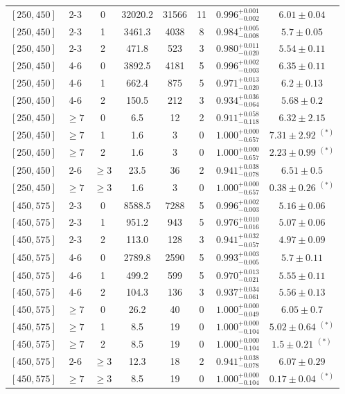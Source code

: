 \begin{table}[!ht]
{\begin{tabular}{ccc|ccccc}
\hline 
$[250,450]$ & 2-3 & 0 & 32020.2 & 31566 & 11 & $0.996^{+0.001}_{-0.002}$ & $6.01 \pm 0.04$ \\ 
$[250,450]$ & 2-3 & 1 & 3461.3 & 4038 & 8 & $0.984^{+0.005}_{-0.008}$ & $5.7 \pm 0.05$ \\ 
$[250,450]$ & 2-3 & 2 & 471.8 & 523 & 3 & $0.980^{+0.011}_{-0.020}$ & $5.54 \pm 0.11$ \\ 
$[250,450]$ & 4-6 & 0 & 3892.5 & 4181 & 5 & $0.996^{+0.002}_{-0.003}$ & $6.35 \pm 0.11$ \\ 
$[250,450]$ & 4-6 & 1 & 662.4 & 875 & 5 & $0.971^{+0.013}_{-0.020}$ & $6.2 \pm 0.13$ \\ 
$[250,450]$ & 4-6 & 2 & 150.5 & 212 & 3 & $0.934^{+0.036}_{-0.064}$ & $5.68 \pm 0.2$ \\ 
$[250,450]$ & $\geq7$ & 0 & 6.5 & 12 & 2 & $0.911^{+0.058}_{-0.118}$ & $6.32 \pm 2.15$ \\ 
$[250,450]$ & $\geq7$ & 1 & 1.6 & 3 & 0 & $1.000^{+0.000}_{-0.657}$ & $7.31 \pm 2.92$ $^{(*)}$ \\ 
$[250,450]$ & $\geq7$ & 2 & 1.6 & 3 & 0 & $1.000^{+0.000}_{-0.657}$ & $2.23 \pm 0.99$ $^{(*)}$ \\ 
$[250,450]$ & 2-6 & $\geq3$ & 23.5 & 36 & 2 & $0.941^{+0.038}_{-0.078}$ & $6.51 \pm 0.5$ \\ 
$[250,450]$ & $\geq7$ & $\geq3$ & 1.6 & 3 & 0 & $1.000^{+0.000}_{-0.657}$ & $0.38 \pm 0.26$ $^{(*)}$ \\ 
\hline 
$[450,575]$ & 2-3 & 0 & 8588.5 & 7288 & 5 & $0.996^{+0.002}_{-0.003}$ & $5.16 \pm 0.06$ \\ 
$[450,575]$ & 2-3 & 1 & 951.2 & 943 & 5 & $0.976^{+0.010}_{-0.016}$ & $5.07 \pm 0.06$ \\ 
$[450,575]$ & 2-3 & 2 & 113.0 & 128 & 3 & $0.941^{+0.032}_{-0.057}$ & $4.97 \pm 0.09$ \\ 
$[450,575]$ & 4-6 & 0 & 2789.8 & 2590 & 5 & $0.993^{+0.003}_{-0.005}$ & $5.7 \pm 0.11$ \\ 
$[450,575]$ & 4-6 & 1 & 499.2 & 599 & 5 & $0.970^{+0.013}_{-0.021}$ & $5.55 \pm 0.11$ \\ 
$[450,575]$ & 4-6 & 2 & 104.3 & 136 & 3 & $0.937^{+0.034}_{-0.061}$ & $5.56 \pm 0.13$ \\ 
$[450,575]$ & $\geq7$ & 0 & 26.2 & 40 & 0 & $1.000^{+0.000}_{-0.049}$ & $6.05 \pm 0.7$ \\ 
$[450,575]$ & $\geq7$ & 1 & 8.5 & 19 & 0 & $1.000^{+0.000}_{-0.104}$ & $5.02 \pm 0.64$ $^{(*)}$ \\ 
$[450,575]$ & $\geq7$ & 2 & 8.5 & 19 & 0 & $1.000^{+0.000}_{-0.104}$ & $1.5 \pm 0.21$ $^{(*)}$ \\ 
$[450,575]$ & 2-6 & $\geq3$ & 12.3 & 18 & 2 & $0.941^{+0.038}_{-0.078}$ & $6.07 \pm 0.29$ \\ 
$[450,575]$ & $\geq7$ & $\geq3$ & 8.5 & 19 & 0 & $1.000^{+0.000}_{-0.104}$ & $0.17 \pm 0.04$ $^{(*)}$ \\ 
\hline
\end{tabular}
}
\end{table}


